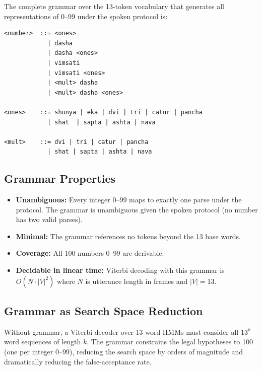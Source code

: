 \documentclass[12pt,a4paper]{article}
\begin{document}
The complete grammar over the 13-token vocabulary that generates all
representations of 0--99 under the spoken protocol is:

\begin{lstlisting}[language={},
  caption={SankhyaVox BNF Grammar --- 0 to 99},
  label={lst:grammar},
  backgroundcolor=\color{lightgray},
  basicstyle=\small\ttfamily\color{black},
  keywordstyle=\color{black},
  frame=single, rulecolor=\color{deepblue}]
<number>  ::= <ones>
            | dasha
            | dasha <ones>
            | vimsati
            | vimsati <ones>
            | <mult> dasha
            | <mult> dasha <ones>

<ones>    ::= shunya | eka | dvi | tri | catur | pancha
            | shat  | sapta | ashta | nava

<mult>    ::= dvi | tri | catur | pancha
            | shat | sapta | ashta | nava
\end{lstlisting}

\subsection{Grammar Properties}

\begin{itemize}[itemsep=3pt]
  \item \textbf{Unambiguous:} Every integer 0--99 maps to exactly one parse
        under the protocol. The grammar is unambiguous given the spoken protocol
        (no number has two valid parses).
  \item \textbf{Minimal:} The grammar references no tokens beyond the 13 base
        words.
  \item \textbf{Coverage:} All 100 numbers 0--99 are derivable.
  \item \textbf{Decidable in linear time:} Viterbi decoding with this grammar
        is $O(N \cdot |V|^2)$ where $N$ is utterance length in frames and
        $|V| = 13$.
\end{itemize}

\subsection{Grammar as Search Space Reduction}

Without grammar, a Viterbi decoder over 13 word-HMMs must consider all
$13^k$ word sequences of length $k$.
The grammar constrains the legal hypotheses to 100 (one per integer 0--99),
reducing the search space by orders of magnitude and dramatically reducing
the false-acceptance rate.
\end{document}
